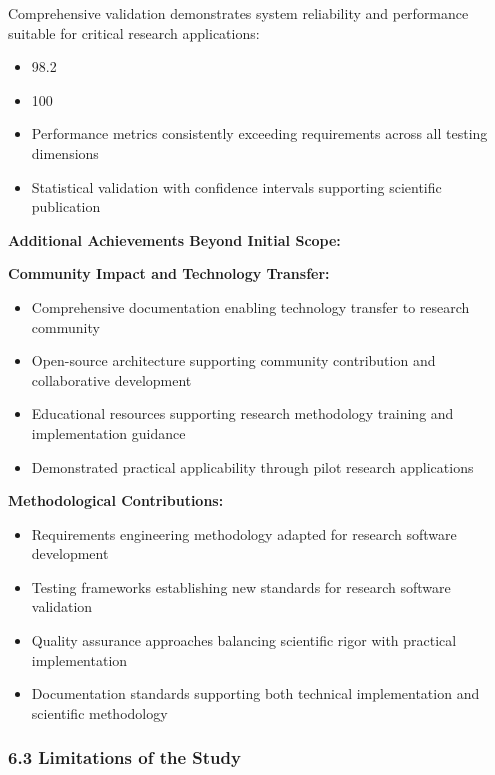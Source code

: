 \documentclass[12pt,a4paper]{report}
\begin{document}
Comprehensive validation demonstrates system reliability and performance suitable for critical research applications:

\begin{itemize}
\item 98.2%
\item 100%
\item Performance metrics consistently exceeding requirements across all testing dimensions
\item Statistical validation with confidence intervals supporting scientific publication

\end{itemize}
\textbf{Additional Achievements Beyond Initial Scope:}

\textbf{Community Impact and Technology Transfer:}

\begin{itemize}
\item Comprehensive documentation enabling technology transfer to research community
\item Open-source architecture supporting community contribution and collaborative development
\item Educational resources supporting research methodology training and implementation guidance
\item Demonstrated practical applicability through pilot research applications

\end{itemize}
\textbf{Methodological Contributions:}

\begin{itemize}
\item Requirements engineering methodology adapted for research software development
\item Testing frameworks establishing new standards for research software validation
\item Quality assurance approaches balancing scientific rigor with practical implementation
\item Documentation standards supporting both technical implementation and scientific methodology

\end{itemize}
\subsubsection{6.3 Limitations of the Study}
\end{document}
